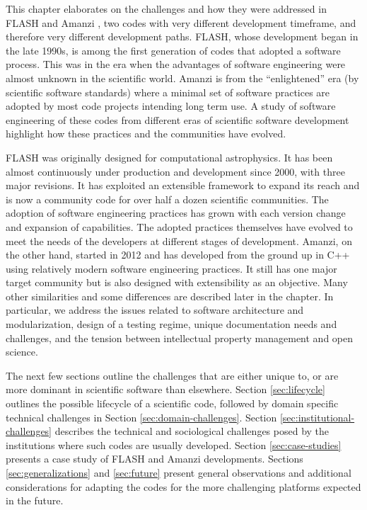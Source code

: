 This chapter elaborates on the challenges and how they were
addressed in FLASH \cite{Dubey2009, Fryxell2000} and Amanzi
\cite{moulton2011}, two codes with very   
different development timeframe, and therefore very different
development paths. FLASH, whose development began in the late 1990s,
is among the first generation of codes that
adopted a software process. This was in the era when the advantages of
software engineering were almost unknown in the scientific
world. Amanzi is from the ``enlightened'' era (by scientific software
standards) where a minimal set of software practices are adopted by
most code projects intending long term use. A study of software
engineering of these codes from different eras of scientific software
development highlight how these practices  and the communities have
evolved.    

FLASH was originally designed for computational
astrophysics. It has been almost continuously 
under production and development since 2000, with three major
revisions. It has exploited an extensible framework to expand its
reach and is now a community code for over half a dozen scientific
communities. The adoption of software engineering practices has
grown with each version change and expansion of capabilities. The
adopted practices themselves have evolved to meet the needs of the
developers at different stages of development. Amanzi, on the other
hand, started in 2012 and has developed 
from the ground up in C++ using relatively modern software engineering
practices. It still has one major target community but is also
designed with extensibility as an objective. Many other
similarities and some differences are described later in the chapter.
In particular, we address the issues related to software
architecture and modularization, design of a testing regime,
unique documentation needs and challenges, and the tension between intellectual property
management and open science.

The next few sections outline the challenges that  
are either unique to, or are more dominant in scientific
software than elsewhere. Section \ref{sec:lifecycle} outlines the possible
lifecycle of a scientific code, followed by domain specific
technical challenges in Section \ref{sec:domain-challenges}. Section
\ref{sec:institutional-challenges} describes the
technical and sociological challenges posed by the institutions
where such codes are usually developed. Section
\ref{sec:case-studies} presents a case study of FLASH and Amanzi
developments. Sections \ref{sec:generalizations} and \ref{sec:future}
present general observations and additional considerations for
adapting the codes for the more challenging platforms expected in the
future. 

